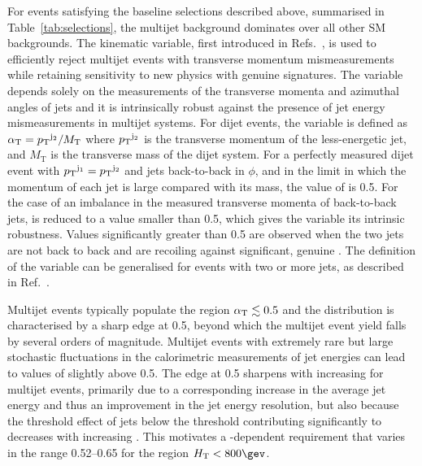 For events satisfying the baseline selections described above,
summarised in Table~\ref{tab:selections}, the multijet background
dominates over all other SM backgrounds. The \alphat kinematic
variable, first introduced in Refs.~\cite{Randall:2008rw, RA1Paper},
is used to efficiently reject multijet events with transverse momentum
mismeasurements while retaining sensitivity to new physics with
genuine \ptvecmiss signatures. The variable \alphat depends solely on
the measurements of the transverse momenta and azimuthal angles of
jets and it is intrinsically robust against the presence of jet energy
mismeasurements in multijet systems. For dijet events, the \alphat
variable is defined as $\alpha_{\text{T}} = {p_{\text T}}^{\rm j_2}/M_\text{T}$ where
${p_{\text T}}^{\rm j_2}$ is the transverse momentum of the less-energetic jet,
and $M_\text{T}$ is the transverse mass of the dijet system.  For a
perfectly measured dijet event with ${p_{\text T}}^{\mathrm{j}_1} =
{p_{\text T}}^{\mathrm{j}_2}$ and jets back-to-back in $\phi$, and in the limit
in which the momentum of each jet is large compared with its mass, the
value of \alphat is 0.5. For the case of an imbalance in the measured
transverse momenta of back-to-back jets, \alphat is reduced to a value
smaller than 0.5, which gives the variable its intrinsic
robustness. Values significantly greater than 0.5 are observed when
the two jets are not back to back and are recoiling against
significant, genuine \ptvecmiss. The definition of the \alphat
variable can be generalised for events with two or more jets, as
described in Ref.~\cite{RA1Paper2012}.

Multijet events typically populate the region $\alpha_{\text{T}} \lesssim 0.5$
and the \alphat distribution is characterised by a sharp edge at 0.5,
beyond which the multijet event yield falls by several orders of
magnitude. Multijet events with extremely rare but large stochastic
fluctuations in the calorimetric measurements of jet energies can lead
to values of \alphat slightly above 0.5. The edge at 0.5 sharpens with
increasing \scalht for multijet events, primarily due to a
corresponding increase in the average jet energy and thus an
improvement in the jet energy resolution, but also because the
threshold effect of jets below the \Pt threshold contributing
significantly to \mht decreases with increasing \scalht. This
motivates a \scalht-dependent \alphat requirement that varies in the
range 0.52--0.65 for the region $\scalht < 800\gev$.

